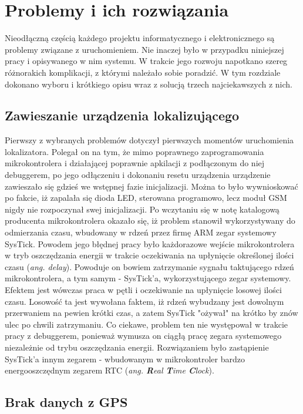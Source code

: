 \chapter{Problemy i ich rozwiązania}
\label{problems_and_solutions}

Nieodłączną częścią każdego projektu informatycznego i elektronicznego są problemy związane z uruchomieniem. Nie inaczej było w przypadku niniejszej pracy i opisywanego w nim systemu. W trakcie jego rozwoju napotkano szereg różnorakich komplikacji, z którymi należało sobie poradzić. W tym rozdziale dokonano wyboru i krótkiego opisu wraz z solucją trzech najciekawszych z nich.


\section{Zawieszanie urządzenia lokalizującego}

Pierwszy z wybranych problemów dotyczył pierwszych momentów uruchomienia lokalizatora. Polegał on na tym, że mimo poprawnego zaprogramowania mikrokontrolera i działającej poprawnie apkilacji z podłączonym do niej debuggerem, po jego odłączeniu i dokonaniu resetu urządzenia urządzenie zawieszało się gdzieś we wstępnej fazie inicjalizacji. Można to było wywnioskować po fakcie, iż zapalała się dioda LED, sterowana programowo, lecz moduł GSM nigdy nie rozpoczynał swej inicjalizacji. Po wczytaniu się w notę katalogową producenta mikrokontrolera okazało się, iż problem stanowił wykorzystywany do odmierzania czasu, wbudowany w rdzeń przez firmę ARM zegar systemowy SysTick. Powodem jego błędnej pracy było każdorazowe wejście mikrokontrolera w tryb oszczędzania energii w trakcie oczekiwania na upłynięcie określonej ilości czasu (\textit{ang. delay}). Powoduje on bowiem zatrzymanie sygnału taktującego rdzeń mikrokontrolera, a tym samym - SysTick'a, wykorzystującego zegar systemowy. Efektem jest wówczas praca w pętli i oczekiwanie na upłynięcie losowej ilości czasu. Losowość ta jest wywołana faktem, iż rdzeń wybudzany jest dowolnym przerwaniem na pewien krótki czas, a zatem SysTick "ożywał" na krótko by znów ulec po chwili zatrzymaniu. Co ciekawe, problem ten nie występował w trakcie pracy z debuggerem, ponieważ wymusza on ciągłą pracę zegara systemowego niezależnie od trybu oszczędzania energii. Rozwiązaniem było zastąpienie SysTick'a innym zegarem - wbudowanym w mikrokontroler bardzo energooszczędnym zegarem RTC (\textit{ang. \textbf{R}eal \textbf{T}ime \textbf{C}lock}).

\section{Brak danych z GPS}

